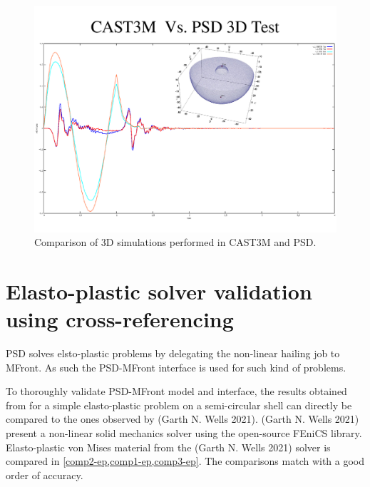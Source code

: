 \begin{figure}
	\centering
	\includegraphics[width=.85\textwidth]{./Images/Cast3MPSD.pdf}
	\caption{Comparison of 3D simulations performed  in CAST3M and PSD.   }\label{fig:CastemPSD3D}
\end{figure}



\section{Elasto-plastic solver validation using cross-referencing}

PSD solves elsto-plastic problems by delegating the non-linear hailing job to MFront. As such the PSD-MFront interface is used for such kind of problems.
 
To thoroughly validate PSD-MFront model and interface, the results
obtained from for a simple elasto-plastic problem on a semi-circular shell can directly be compared to the ones
observed by (Garth N. Wells 2021). (Garth N. Wells 2021) present a
non-linear solid mechanics solver using the open-source FEniCS library.
Elasto-plastic von Mises material from the (Garth N. Wells 2021) solver
is compared in \cref{comp2-ep,comp1-ep,comp3-ep}. The comparisons match with a
good order of accuracy.

